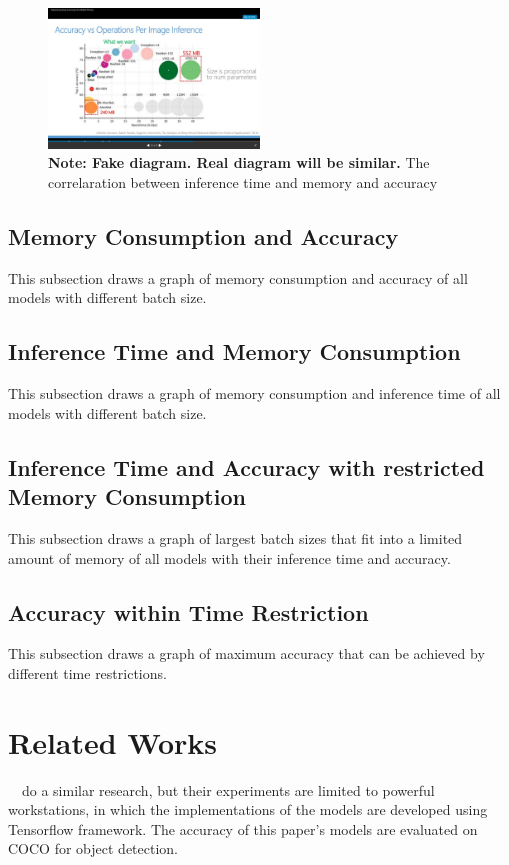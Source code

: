 \documentclass[conference]{IEEEtran}
\begin{document}
\begin{figure}[htpb]
	  \centering
	  \includegraphics[width=0.5\textwidth]{time-memory-accuracy}
	  \caption{\textbf{Note: Fake diagram. Real diagram will be similar.} The correlaration between inference time and memory and accuracy}
	  \label{fig:time-memory-accuracy}
\end{figure}


\subsection{Memory Consumption and Accuracy}
This subsection draws a graph of memory consumption and accuracy of all models with different batch size.

\subsection{Inference Time and Memory Consumption}
This subsection draws a graph of memory consumption and inference time of all models with different batch size.

\subsection{Inference Time and Accuracy with restricted Memory Consumption}
This subsection draws a graph of largest batch sizes that fit into a limited amount of memory of all models with their inference time and accuracy.

\subsection{Accuracy within Time Restriction}
This subsection draws a graph of maximum accuracy that can be achieved by different time restrictions. 

\section{Related Works}
~\cite{huang2017speed}~do a similar research, but their experiments are limited to powerful workstations, in which the implementations of the models are developed using Tensorflow framework. The accuracy of this paper's models are evaluated on COCO for object detection.
\end{document}
